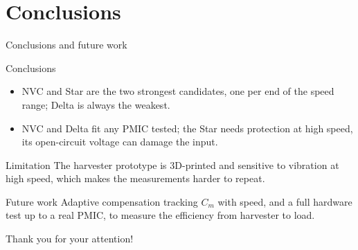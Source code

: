\documentclass{beamer}
\begin{document}
\section{Conclusions}

\begin{frame}{Conclusions and future work}
    \begin{block}{Conclusions}
        \begin{itemize}
            \item \alert{NVC and Star} are the two strongest candidates, one per
                  end of the speed range; Delta is always the weakest.
            \item NVC and Delta fit any PMIC tested; the Star needs protection at
                  high speed, its open-circuit voltage can damage the input.
        \end{itemize}
    \end{block}
    \begin{alertblock}{Limitation}
        The harvester prototype is 3D-printed and sensitive to vibration at high
        speed, which makes the measurements harder to repeat.
    \end{alertblock}
    \begin{block}{Future work}
        Adaptive compensation tracking $C_m$ with speed, and a full hardware test
        up to a real PMIC, to measure the efficiency from harvester to load.
    \end{block}
\end{frame}

\begin{emptyframe}
    Thank you for your attention!
\end{emptyframe}
\end{document}
